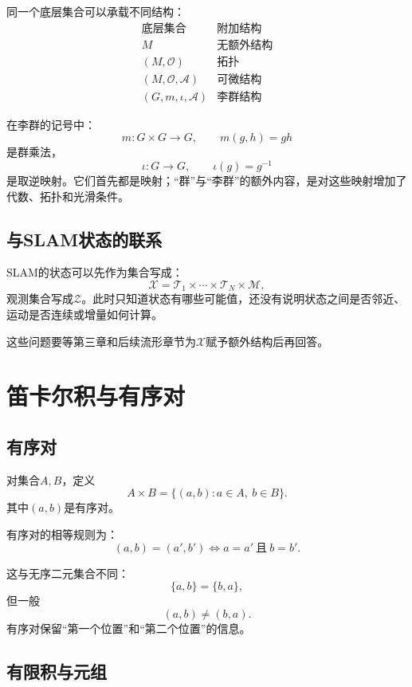 同一个底层集合可以承载不同结构：
\[
\begin{array}{c|c}
\text{底层集合}&\text{附加结构}\\
\hline
M&\text{无额外结构}\\
(M,\mathcal O)&\text{拓扑}\\
(M,\mathcal O,\mathcal A)&\text{可微结构}\\
(G,m,\iota,\mathcal A)&\text{李群结构}
\end{array}
\]

在李群的记号中：
\[
    m:G\times G\to G,\qquad
    m(g,h)=gh
\]
是群乘法，
\[
    \iota:G\to G,\qquad
    \iota(g)=g^{-1}
\]
是取逆映射。它们首先都是映射；“群”与“李群”的额外内容，是对这些映射增加了代数、拓扑和光滑条件。

\subsection{与SLAM状态的联系}

SLAM的状态可以先作为集合写成：
\[
    \mathcal X
    =
    \mathcal T_1\times\cdots\times\mathcal T_N\times\mathcal M,
\]
观测集合写成$\mathcal Z$。此时只知道状态有哪些可能值，还没有说明状态之间是否邻近、运动是否连续或增量如何计算。

这些问题要等第三章和后续流形章节为$\mathcal X$赋予额外结构后再回答。


\section{笛卡尔积与有序对}

\subsection{有序对}

\begin{definition}[笛卡尔积]
对集合$A,B$，定义
\[
    A\times B
    =
    \{(a,b):a\in A,\ b\in B\}.
\]
其中$(a,b)$是有序对。
\end{definition}

有序对的相等规则为：
\[
    (a,b)=(a',b')
    \Longleftrightarrow
    a=a'\ \text{且}\ b=b'.
\]

这与无序二元集合不同：
\[
    \{a,b\}=\{b,a\},
\]
但一般
\[
    (a,b)\neq(b,a).
\]
有序对保留“第一个位置”和“第二个位置”的信息。

\subsection{有限积与元组}

